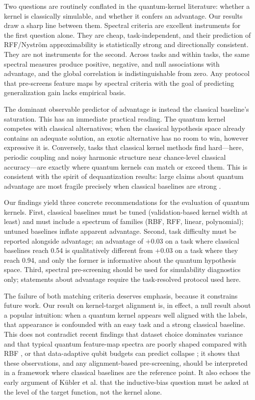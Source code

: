 \documentclass[aps,pra,preprint]{revtex4-2}
\begin{document}
Two questions are routinely conflated in the quantum-kernel literature: whether a kernel
is classically simulable, and whether it confers an advantage. Our results draw a sharp
line between them. Spectral criteria are excellent instruments for the first question
alone. They are cheap, task-independent, and their prediction of RFF/Nystr\"om
approximability is statistically strong and directionally consistent. They are not
instruments for the second. Across tasks and within tasks, the same spectral measures
produce positive, negative, and null associations with advantage, and the global
correlation is indistinguishable from zero. Any protocol that pre-screens feature maps
by spectral criteria with the goal of predicting generalization gain lacks empirical
basis.

The dominant observable predictor of advantage is instead the classical baseline's
saturation. This has an immediate practical reading. The quantum kernel competes with
classical alternatives; when the classical hypothesis space already contains an
adequate solution, an exotic alternative has no room to win, however expressive it is.
Conversely, tasks that classical kernel methods find hard---here, periodic coupling and
noisy harmonic structure near chance-level classical accuracy---are exactly where
quantum kernels can match or exceed them. This is consistent with the spirit of
dequantization results: large claims about quantum advantage are most fragile
precisely when classical baselines are strong \cite{sweke2025,shin2024}.

Our findings yield three concrete recommendations for the evaluation of quantum kernels.
First, classical baselines must be tuned (validation-based kernel width at least) and
must include a spectrum of families (RBF, RFF, linear, polynomial); untuned baselines
inflate apparent advantage. Second, task difficulty must be reported alongside
advantage; an advantage of $+0.03$ on a task where classical baselines reach 0.54 is
qualitatively different from $+0.03$ on a task where they reach 0.94, and only the
former is informative about the quantum hypothesis space. Third, spectral
pre-screening should be used for simulability diagnostics only; statements about
advantage require the task-resolved protocol used here.

The failure of both matching criteria deserves emphasis, because it constrains future
work. Our result on kernel-target alignment is, in effect, a null result about a
popular intuition: when a quantum kernel appears well aligned with the labels, that
appearance is confounded with an easy task and a strong classical baseline. This does
not contradict recent findings that dataset choice dominates variance and that typical
quantum feature-map spectra are poorly shaped compared with RBF \cite{kakavand2026},
or that data-adaptive qubit budgets can predict collapse \cite{appel2026}; it shows
that these observations, and any alignment-based pre-screening, should be interpreted
in a framework where classical baselines are the reference point. It also echoes the
early argument of K\"ubler et al. \cite{kubler2021} that the inductive-bias question
must be asked at the level of the target function, not the kernel alone.
\end{document}

